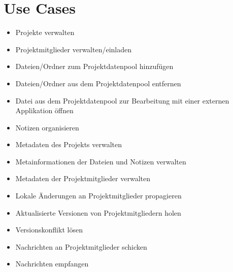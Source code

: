 
\section{Use Cases}


\begin{itemize}
\item Projekte verwalten
\item Projektmitglieder verwalten/einladen
\item Dateien/Ordner zum Projektdatenpool hinzufügen
\item Dateien/Ordner aus dem Projektdatenpool entfernen
\item Datei aus dem Projektdatenpool zur Bearbeitung mit einer externen Applikation öffnen
\item Notizen organisieren
\item Metadaten des Projekts verwalten %
% 
\item Metainformationen der Dateien und Notizen verwalten
\item Metadaten der Projektmitglieder verwalten
\item Lokale Änderungen an Projektmitglieder propagieren
\item Aktualisierte Versionen von Projektmitgliedern holen
\item Versionskonflikt lösen
\item Nachrichten an Projektmitglieder schicken
\item Nachrichten empfangen
\end{itemize}